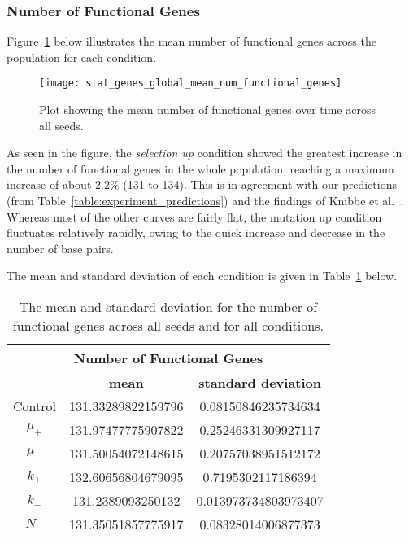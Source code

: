 \subsubsection{Number of Functional Genes}\label{sec:number_of_functional_genes}
Figure~\ref{fig:mean_num_functional_genes} below illustrates the mean number of functional genes across the population for each condition.  
\begin{figure}[H]
	\centering
	\texttt{[image: stat\_genes\_global\_mean\_num\_functional\_genes]}
	\caption[Mean number of functional genes]{Plot showing the mean number of functional genes over time across all seeds.}
	\label{fig:mean_num_functional_genes}
\end{figure}
As seen in the figure, the \textit{selection up} condition showed the greatest increase in the number of functional genes in the whole population, reaching a maximum increase of about 2.2\% (131 to 134). This is in agreement with our predictions (from Table~\ref{table:experiment_predictions}) and the findings of Knibbe et al.~\cite{Knibbe2007}. Whereas most of the other curves are fairly flat, the mutation up condition fluctuates relatively rapidly, owing to the quick increase and decrease in the number of base pairs. 

The mean and standard deviation of each condition is given in Table~\ref{table:number_of_genes_mean_std_dev} below.

\begin{table}[H]
	\centering
	\begin{tabular}{|c|c|c|}
		\hline
		\multicolumn{3}{c}{\Large \textbf{Number of Functional Genes}} \\
		\hline
		& \textbf{mean} & \textbf{standard deviation} \\
		\hline
		Control & 131.33289822159796 & 0.08150846235734634 \\
		\hline
		$\mu_+$ & 131.97477775907822 & 0.25246331309927117 \\
		\hline
		$\mu_-$ & 131.50054072148615 & 0.20757038951512172 \\
		\hline
		$k_+$ & 132.60656804679095 & 0.7195302117186394 \\ 
		\hline
		$k_-$ & 131.2389093250132 & 0.013973734803973407 \\
		\hline
		$N_-$ & 131.35051857775917 & 0.08328014006877373 \\
		\hline
	\end{tabular}
	\caption[Number of functional genes - mean and standard deviation]{The mean and standard deviation for the number of functional genes across all seeds and for all conditions.}
	\label{table:number_of_genes_mean_std_dev}
\end{table}
